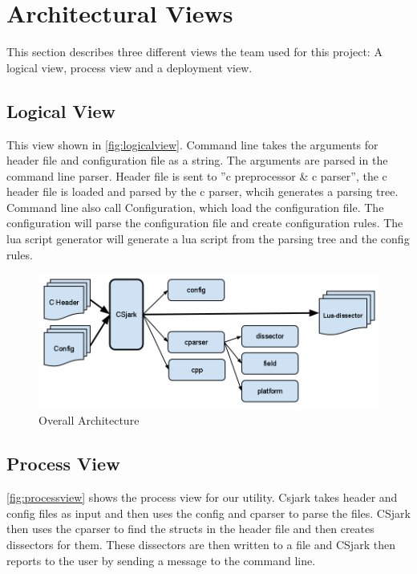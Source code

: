 \section{Architectural Views}
This section describes three different views the team used for this project: A logical view, process view and a deployment view.

\subsection{Logical View}
This view shown in \autoref{fig:logicalview}. Command line takes the arguments for \gls{header} file and configuration file as a string. The arguments are parsed in the command line \gls{parser}. Header file is sent to ''\Gls{c} \gls{preprocessor} \& \Gls{c} \gls{parser}'', the \Gls{c} \gls{header} file is loaded and parsed by the \Gls{c} \gls{parser}, whcih generates a parsing tree. Command line also call Configuration, which load the configuration file. The configuration will parse the configuration file and create configuration rules. The \Gls{lua} \gls{script} generator will generate a \Gls{lua} \gls{script} from the parsing tree and the config rules.

\begin{figure}[htb]
	\includegraphics[width=\textwidth]{./planning/img/final_arch}
	\caption{Overall Architecture\label{fig:logicalview}}
\end{figure}

\subsection{Process View}
\autoref{fig:processview} shows the process view for our \gls{utility}. Csjark takes \gls{header} and config files as input and then uses the config and cparser to parse the files. CSjark then uses the cparser to find the \glspl{struct} in the \gls{header} file and then creates \glspl{dissector} for them. These \glspl{dissector} are then written to a file and CSjark then reports to the user by sending a message to the command line.

